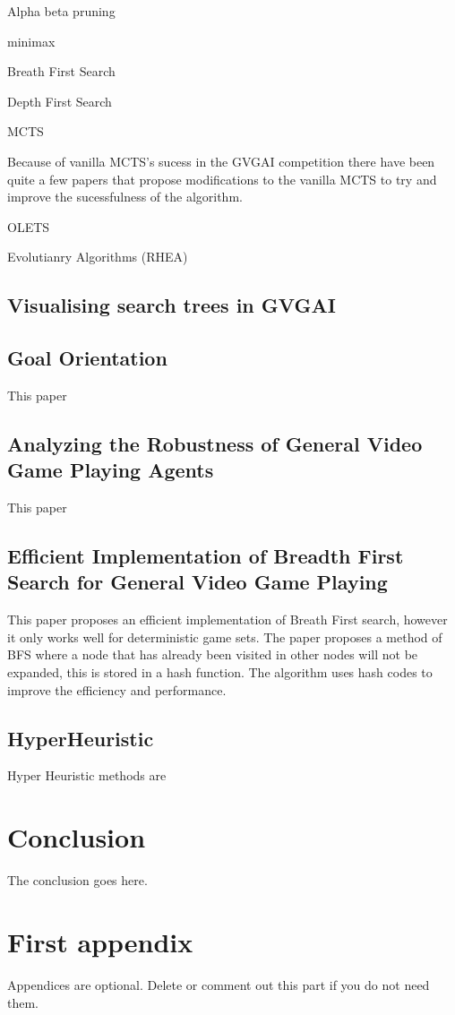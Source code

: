 \documentclass[journal]{IEEEtran}
\begin{document}
Alpha beta pruning

minimax

Breath First Search

Depth First Search

MCTS

Because of vanilla MCTS's sucess in the GVGAI competition there have been quite a few papers that propose modifications to the vanilla MCTS to try and improve the sucessfulness of the algorithm.

OLETS


Evolutianry Algorithms
(RHEA)




\subsection{Visualising search trees in GVGAI}


\subsection{Goal Orientation}
This paper 
\cite{ross2014general}


\subsection{Analyzing the Robustness of General Video Game Playing Agents}
This paper 
\cite{perez2016analyzing}

\subsection{Efficient Implementation of Breadth First Search for General Video Game Playing}
This paper proposes an efficient implementation of Breath First search, however it only works well for deterministic game sets.
The paper proposes a method of BFS where a node that has already been visited in other nodes will not be expanded, this is stored in a hash function.
The algorithm uses hash codes to improve the efficiency and performance.

\cite{EfficientBFS}

\subsection{HyperHeuristic}
Hyper Heuristic methods are 
\cite{hyperHeurisicMendes}

\section{Conclusion}
The conclusion goes here.






\appendices
\section{First appendix}
Appendices are optional. Delete or comment out this part if you do not need them.

\end{document}
